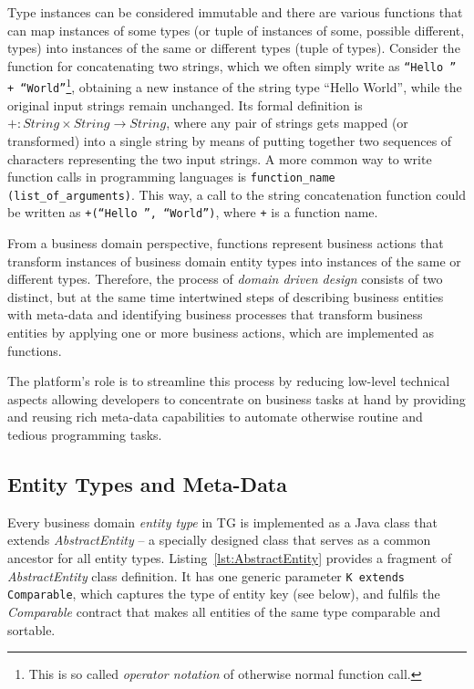   Type instances can be considered immutable and there are various functions that can map instances of some types (or tuple of instances of some, possible different, types) into instances of the same or different types (tuple of types).
  Consider the function for concatenating two strings, which we often simply write as \texttt{``Hello '' + ``World''}\footnote{This is so called \emph{operator notation} of otherwise normal function call.}, obtaining a new instance of the string type ``Hello World'', while the original input strings remain unchanged.
  Its formal definition is $+:String\times String \rightarrow String$, where any pair of strings gets mapped (or transformed) into a single string by means of putting together two sequences of characters representing the two input strings.
  A more common way to write function calls in programming languages is \texttt{function\_name (list\_of\_arguments)}.
  This way, a call to the string concatenation function could be written as \texttt{+(``Hello '', ``World'')}, where \texttt{+} is a function name.

  From a business domain perspective, functions represent business actions that transform instances of business domain entity types into instances of the same or different types.
  Therefore, the process of \emph{domain driven design} consists of two distinct, but at the same time intertwined steps of describing business entities with meta-data and identifying business processes that transform business entities by applying one or more business actions, which are implemented as functions.
  
  The platform's role is to streamline this process by reducing low-level technical aspects allowing developers to concentrate on business tasks at hand by providing and reusing rich meta-data capabilities to automate otherwise routine and tedious programming tasks.

\subsection{Entity Types and Meta-Data}

  Every business domain \emph{entity type} in TG is implemented as a Java class that extends \emph{AbstractEntity} -- a specially designed class that serves as a common ancestor for all entity types.
  Listing~\ref{lst:AbstractEntity} provides a fragment of \emph{AbstractEntity} class definition.
  It has one generic parameter \texttt{K extends Comparable}, which captures the type of entity key (see below), and fulfils the \emph{Comparable} contract that makes all entities of the same type comparable and sortable.
  
